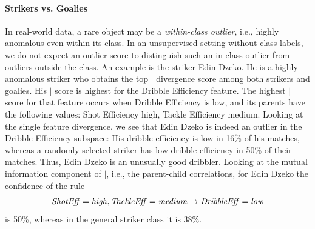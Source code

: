 {							\paragraph{Strikers vs. Goalies} 
							In real-world data, a rare object may be a {\em within-class outlier}, i.e., highly anomalous even within its class. In an unsupervised setting without class labels, we do not expect an outlier score to distinguish such an in-class outlier from outliers outside the class. 
							An example is the striker Edin Dzeko. He is a highly anomalous striker who obtains 
							the top $\mid$ divergence score among both strikers and goalies. His $\mid$ score is highest for the Dribble Efficiency feature. The highest $\mid$ score for that feature occurs when Dribble Efficiency is low, and its parents have the following values: Shot Efficiency high, Tackle Efficiency medium. Looking at the single feature divergence, 
							we see that Edin Dzeko is indeed an outlier in the Dribble Efficiency subspace: His dribble efficiency is low in 16\% of his matches, whereas a randomly selected striker has low dribble efficiency in 50\% of their matches. Thus, Edin Dzeko is an unusually good dribbler. Looking at the mutual information component of $\mid$, i.e., the parent-child correlations, for Edin Dzeko the confidence of the rule 
							$$\it{ShotEff} = \it{high}, \it{TackleEff} = \it{medium}\rightarrow \it{DribbleEff} = \it{low}$$ is 50\%, whereas in the general striker class it is $38\%$.
							
}
